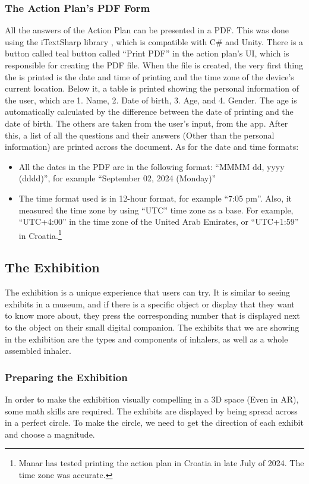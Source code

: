 \subsubsection*{The Action Plan’s PDF Form}
All the answers of the Action Plan can be presented in a PDF. This was done using the iTextSharp library \cite{iTextSharp}, which is compatible with C\# and Unity. There is a button called teal button called “Print PDF” in the action plan’s UI, which is responsible for creating the PDF file. When the file is created, the very first thing the is printed is the date and time of printing and the time zone of the device’s current location. Below it, a table is printed showing the personal information of the user, which are 1. Name, 2. Date of birth, 3. Age, and 4. Gender. The age is automatically calculated by the difference between the date of printing and the date of birth. The others are taken from the user’s input, from the app. After this, a list of all the questions and their answers (Other than the personal information) are printed across the document. As for the date and time formats:
\begin{itemize}
    \item{All the dates in the PDF are in the following format: “MMMM dd, yyyy (dddd)”, for example “September 02, 2024 (Monday)”}
    
    \item{The time format used is in 12-hour format, for example “7:05 pm”. Also, it measured the time zone by using “UTC” time zone as a base. For example, “UTC+4:00” in the time zone of the United Arab Emirates, or “UTC+1:59” in Croatia.\footnote{Manar has tested printing the action plan in Croatia in late July of 2024. The time zone was accurate.}}
\end{itemize}

\subsection{The Exhibition}

The exhibition is a unique experience that users can try. It is similar to seeing exhibits in a museum, and if there is a specific object or display that they want to know more about, they press the corresponding number that is displayed next to the object on their small digital companion. The exhibits that we are showing in the exhibition are the types and components of inhalers, as well as a whole assembled inhaler.

\subsubsection*{Preparing the Exhibition}
In order to make the exhibition visually compelling in a 3D space (Even in AR), some math skills are required. The exhibits are displayed by being spread across in a perfect circle. To make the circle, we need to get the direction of each exhibit and choose a magnitude. 

